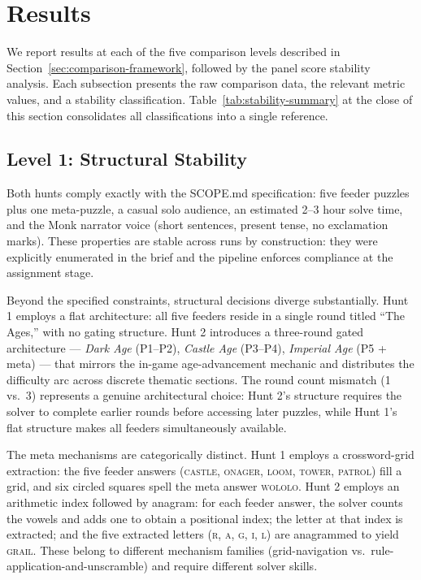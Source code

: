 \section{Results}
\label{sec:results}

We report results at each of the five comparison levels described in Section~\ref{sec:comparison-framework}, followed by the panel score stability analysis. Each subsection presents the raw comparison data, the relevant metric values, and a stability classification. Table~\ref{tab:stability-summary} at the close of this section consolidates all classifications into a single reference.

\subsection{Level 1: Structural Stability}
\label{sec:results-structure}

Both hunts comply exactly with the SCOPE.md specification: five feeder puzzles plus one meta-puzzle, a casual solo audience, an estimated 2--3 hour solve time, and the Monk narrator voice (short sentences, present tense, no exclamation marks). These properties are stable across runs by construction: they were explicitly enumerated in the brief and the pipeline enforces compliance at the assignment stage.

Beyond the specified constraints, structural decisions diverge substantially. Hunt 1 employs a flat architecture: all five feeders reside in a single round titled ``The Ages,'' with no gating structure. Hunt 2 introduces a three-round gated architecture --- \textit{Dark Age} (P1--P2), \textit{Castle Age} (P3--P4), \textit{Imperial Age} (P5 + meta) --- that mirrors the in-game age-advancement mechanic and distributes the difficulty arc across discrete thematic sections. The round count mismatch (1 vs.\ 3) represents a genuine architectural choice: Hunt 2's structure requires the solver to complete earlier rounds before accessing later puzzles, while Hunt 1's flat structure makes all feeders simultaneously available.

The meta mechanisms are categorically distinct. Hunt 1 employs a crossword-grid extraction: the five feeder answers (\textsc{castle}, \textsc{onager}, \textsc{loom}, \textsc{tower}, \textsc{patrol}) fill a grid, and six circled squares spell the meta answer \textsc{wololo}. Hunt 2 employs an arithmetic index followed by anagram: for each feeder answer, the solver counts the vowels and adds one to obtain a positional index; the letter at that index is extracted; and the five extracted letters (\textsc{r}, \textsc{a}, \textsc{g}, \textsc{i}, \textsc{l}) are anagrammed to yield \textsc{grail}. These belong to different mechanism families (grid-navigation vs.\ rule-application-and-unscramble) and require different solver skills.

